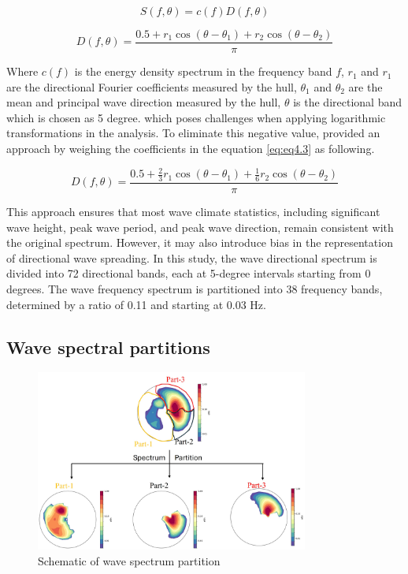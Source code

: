 \begin{equation}
    S(f,\theta) = c(f)D(f,\theta)
\label{eq:eq4.2}
\end{equation}

\begin{equation}
    D(f,\theta)=\frac{0.5+r_1\cos(\theta-\theta_1)+r_2\cos(\theta-\theta_2)}{\pi}
\label{eq:eq4.3}
\end{equation}

Where $c(f)$ is the energy density spectrum in the frequency band $f$, $r_1$ and
$r_1$ are the directional Fourier coefficients measured by the hull, $\theta_1$
and $\theta_2$  are the mean and principal wave direction measured by the hull,
$\theta$ is the directional band which is chosen as 5 degree. which poses
challenges when applying logarithmic transformations in the analysis. To
eliminate this negative value, \citet{earle_use_1999} provided an approach by
weighing the coefficients in the equation \ref{eq:eq4.3} as following.

\begin{equation}
    D(f,\theta)=\frac{0.5+\frac{2}{3}r_1\cos(\theta-\theta_1)+\frac{1}{6}r_2\cos(\theta-\theta_2)}{\pi}
\label{eq:eq4.4}
\end{equation}

This approach ensures that most wave climate statistics, including significant
wave height, peak wave period, and peak wave direction, remain consistent with
the original spectrum. However, it may also introduce bias in the representation
of directional wave spreading. In this study, the wave directional spectrum is
divided into 72 directional bands, each at 5-degree intervals starting from 0
degrees. The wave frequency spectrum is partitioned into 38 frequency bands,
determined by a ratio of 0.11 and starting at 0.03 Hz.

\subsection{Wave spectral partitions}
\label{Wave spectral partitions}

\begin{figure}[htbp]
  \centering
  \includegraphics[width=0.8\textwidth]{chapter4/resources/figure4-3.jpg}
  \caption{Schematic of wave spectrum partition}
  \label{fig:fig4.3}
\end{figure}

